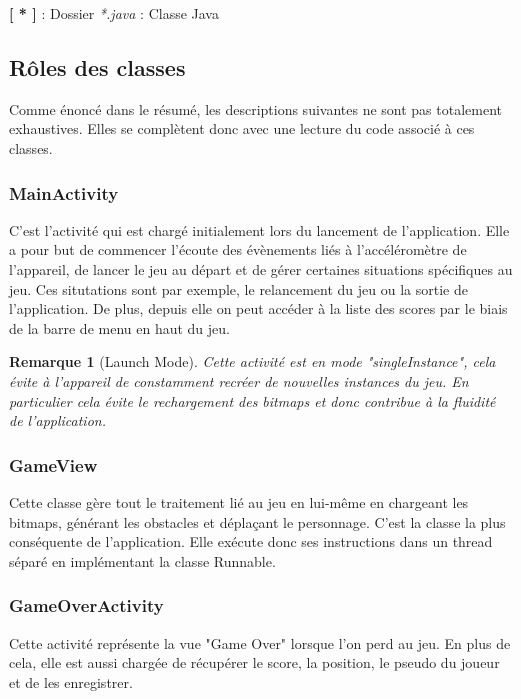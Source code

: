 \documentclass[12pt,a4paper,abstract=on,parskip=full]{scrartcl}
\newtheorem*{remark}{Remarque}
\begin{document}
\hspace{50pt} \textbf{[ * ]} : Dossier \hspace{50pt} {\color{blue} \textit{*.java}} : Classe Java




\subsection{Rôles des classes}
Comme énoncé dans le résumé, les descriptions suivantes ne sont pas totalement exhaustives. Elles se complètent donc avec une lecture du code associé à ces classes.  
\subsubsection[MainActivity]{\color{blue} MainActivity}
C'est l'activité qui est chargé initialement lors du lancement de l'application. Elle a pour but de commencer l'écoute des évènements liés à l'accéléromètre de l'appareil, de lancer le jeu au départ et de gérer certaines situations spécifiques au jeu.
Ces situtations sont par exemple, le relancement du jeu ou la sortie de l'application.
De plus, depuis elle on peut accéder à la liste des scores par le biais de la barre de menu en haut du jeu.

\begin{remark}[Launch Mode]
Cette activité est en mode "singleInstance", cela évite à l'appareil de constamment recréer de nouvelles instances du jeu. En particulier cela évite le rechargement des bitmaps et donc contribue à la fluidité de l'application. 
\end{remark}

\subsubsection[GameView]{\color{blue} GameView}
Cette classe gère tout le traitement lié au jeu en lui-même en chargeant les bitmaps, générant les obstacles et déplaçant le personnage.
C'est la classe la plus conséquente de l'application.
Elle exécute donc ses instructions dans un thread séparé en implémentant la classe Runnable. 

\subsubsection[GameOverActivity]{\color{blue} GameOverActivity}
Cette activité représente la vue "Game Over" lorsque l'on perd au jeu. En plus de cela, elle est aussi chargée de récupérer le score, la position, le pseudo du joueur et de les enregistrer.
\end{document}
